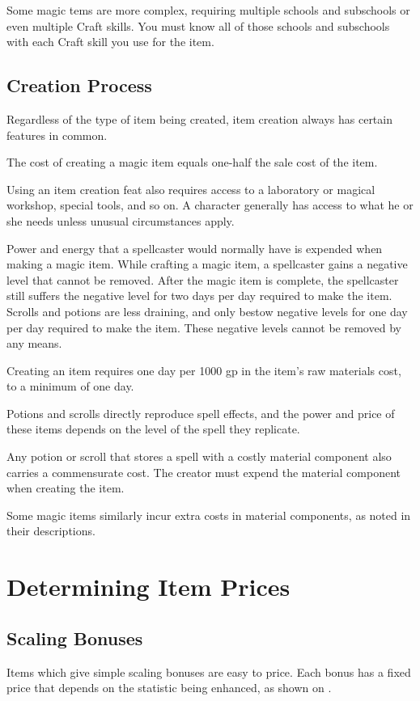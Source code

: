 Some magic tems are more complex, requiring multiple schools and subschools or even multiple Craft skills. You must know all of those schools and subschools with each Craft skill you use for the item.

\subsection{Creation Process}
Regardless of the type of item being created, item creation always has certain features in common.

 The cost of creating a magic item equals one-half the sale cost of the item.

Using an item creation feat also requires access to a laboratory or magical workshop, special tools, and so on. A character generally has access to what he or she needs unless unusual circumstances apply.

 Power and energy that a spellcaster would normally have is expended when making a magic item. While crafting a magic item, a spellcaster gains a negative level that cannot be removed. After the magic item is complete, the spellcaster still suffers the negative level for two days per day required to make the item. Scrolls and potions are less draining, and only bestow negative levels for one day per day required to make the item. These negative levels cannot be removed by any means.

 Creating an item requires one day per 1000 gp in the item's raw materials cost, to a minimum of one day.

 Potions and scrolls directly reproduce spell effects, and the power and price of these items depends on the level of the spell they replicate.

 Any potion or scroll that stores a spell with a costly material component also carries a commensurate cost. The creator must expend the material component when creating the item.

\par Some magic items similarly incur extra costs in material components, as noted in their descriptions.

\section{Determining Item Prices}

\subsection{Scaling Bonuses}
Items which give simple scaling bonuses are easy to price. Each bonus has a fixed price that depends on the statistic being enhanced, as shown on .

